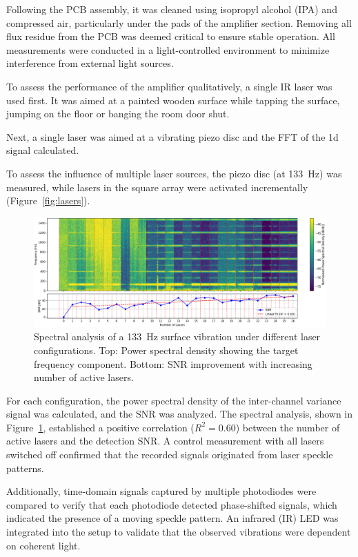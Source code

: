 Following the PCB assembly, it was cleaned using isopropyl alcohol (IPA) and compressed air, particularly under the pads of the amplifier section. 
Removing all flux residue from the PCB was deemed critical to ensure stable operation. 
All measurements were conducted in a light-controlled environment to minimize interference from external light sources.

To assess the performance of the amplifier qualitatively, a single IR laser was used first. 
It was aimed at a painted wooden surface while tapping the surface, jumping on the floor or banging the room door shut. 

Next, a single laser was aimed at a vibrating piezo disc and the FFT of the 1d signal calculated.

To assess the influence of multiple laser sources, the piezo disc (at 133~Hz) was measured,
while lasers in the square array were activated incrementally (Figure~\ref{fig:lasers}). 

\begin{figure}[t]
    \centering
    \includegraphics[width=\textwidth]{figures/results/multilaser_spectrogram.png}
    \caption{Spectral analysis of a 133~Hz surface vibration under different laser configurations. 
    Top: Power spectral density showing the target frequency component. Bottom: SNR improvement with increasing number of active lasers.}
    \label{fig:laser_snr}
\end{figure}

For each configuration, the power spectral density of the inter-channel variance signal was calculated, and the SNR was analyzed. 
The spectral analysis, shown in Figure~\ref{fig:laser_snr}, 
established a positive correlation ($R^2 = 0.60$) between the number of active lasers and the detection SNR. 
A control measurement with all lasers switched off confirmed that the recorded signals originated from laser speckle patterns.

Additionally, time-domain signals captured by multiple photodiodes were compared to verify that each photodiode detected phase-shifted signals, which indicated the presence of a moving speckle pattern. 
An infrared (IR) LED was integrated into the setup to validate that the observed vibrations were dependent on coherent light.

